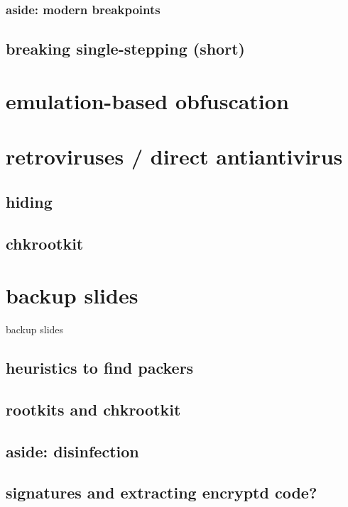 

\subsubsection{aside: modern breakpoints}


\subsection{breaking single-stepping (short)}


\section{emulation-based obfuscation}


\section{retroviruses / direct antiantivirus}


\subsection{hiding}


\subsection{chkrootkit}



\section{backup slides}
\begin{frame}{backup slides}
\end{frame}

\subsection{heuristics to find packers}


\subsection{rootkits and chkrootkit}


\subsection{aside: disinfection}


\subsection{signatures and extracting encryptd code?}

